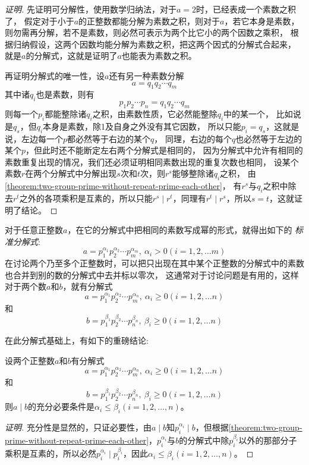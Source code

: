 \begin{proof}[证明]
  先证明可分解性，使用数学归纳法，对于$a=2$时，已经表成一个素数之积了，
  假定对于小于$a$的正整数都能分解为素数之积，则对于$a$，若它本身是素数，
  则勿需再分解，若不是素数，则必然可表示为两个比它小的两个因数之乘积，
  根据归纳假设，这两个因数均能分解为素数之积，把这两个因式的分解式合起来，
  就是$a$的分解式，这就是证明了$a$也能表为素数之积。

  再证明分解式的唯一性，设$a$还有另一种素数分解
  \[ a=q_1q_2 \cdots q_m \]
  其中诸$q_i$也是素数，则有
  \[ p_1p_2 \cdots p_n = q_1q_2 \cdots q_m \]
  则每一个$p_i$都能整除诸$q_i$之积，由素数性质，它必然能整除$q_i$中的某一个，
  比如说是$q_s$，但$q_i$本身是素数，除1及自身之外没有其它因数，
  所以只能$p_i=q_s$，这就是说，左边每一个$p$都必然等于右边的某个$q$，
  同理，右边的每个$q$也必然等于左边的某个$p$，但此时还不能断定左右两个分解式是相同的，
  因为分解式中允许有相同的素数重复出现的情况，我们还必须证明相同素数出现的重复次数也相同，
  设某个素数$r$在两个分解式中分解出现$s$次和$t$次，则$r^s$能够整除诸$q_i$之积，
  由\autoref{theorem:two-group-prime-without-repeat-prime-each-other}，
  有$r^s$与$q_i$之积中除去$r^t$之外的各项乘积是互素的，所以只能$r^s \mid r^t$，同理有$r^t \mid r^s$，所以$s=t$，这就证明了结论。
\end{proof}

对于任意正整数$a$，在它的分解式中把相同的素数写成幂的形式，就得出如下的 \emph{标准分解式}:
\[ a = p_1^{\alpha_1}p_2^{\alpha_2} \cdots p_m^{\alpha_m}, \  \alpha_i > 0 (i=1,2,\ldots m) \]
在讨论两个乃至多个正整数时，可以把只出现在其中某个正整数的分解式中的素数也合并到别的数的分解式中去并标以零次，
这通常对于讨论问题是有用的，这样对于两个数$a$和$b$，就有分解式
\[ a = p_1^{\alpha_1}p_2^{\alpha_2} \cdots p_m^{\alpha_n}, \  \alpha_i \geqslant 0 (i=1,2,\ldots n) \]
和
\[ b = p_1^{\beta_1}p_2^{\beta_2} \cdots p_n^{\beta_n}, \  \beta_i \geqslant 0 (i=1,2,\ldots n) \]

在此分解式基础上，有如下的重磅结论:
\begin{theorem}
  \label{theorem:integer-division-with-prime-decompose}
  设两个正整数$a$和$b$有分解式
\[ a = p_1^{\alpha_1}p_2^{\alpha_2} \cdots p_m^{\alpha_n}, \  \alpha_i \geqslant 0 (i=1,2,\ldots n) \]
和
\[ b = p_1^{\beta_1}p_2^{\beta_2} \cdots p_n^{\beta_n}, \  \beta_i \geqslant 0 (i=1,2,\ldots n) \]
  则$a \mid b$的充分必要条件是$\alpha_i \leqslant \beta_i(i=1,2,\ldots,n)$。
\end{theorem}

\begin{proof}[证明]
  充分性是显然的，只证必要性，由$a \mid b$知$p_i^{\alpha_i} \mid b$，但根据\autoref{theorem:two-group-prime-without-repeat-prime-each-other}，$p_i^{\alpha_i}$与$b$的分解式中除$p_i^{\beta_i}$以外的那部分子乘积是互素的，所以必然$p_i^{\alpha_i} \mid p_i^{\beta_i}$，因此$\alpha_i \leqslant \beta_i(i=1,2,\ldots,n)$。
\end{proof}

